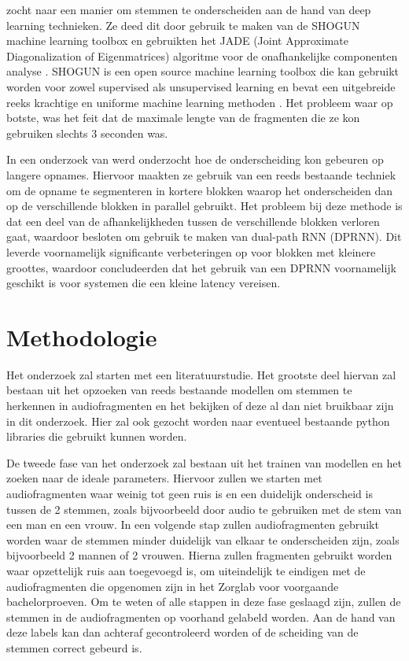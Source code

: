\textcite{Nandal2019} zocht naar een manier om stemmen te onderscheiden aan de hand van deep learning technieken. Ze deed dit door gebruik te maken van de SHOGUN machine learning toolbox en gebruikten het JADE (Joint Approximate Diagonalization of Eigenmatrices) algoritme voor de onafhankelijke componenten analyse \autocite{Nandal2019}. SHOGUN is een open source machine learning toolbox die kan gebruikt worden voor zowel supervised als unsupervised learning en bevat een uitgebreide reeks krachtige en uniforme machine learning methoden \Autocite{Nandal2019}. Het probleem waar \textcite{Nandal2019} op botste, was het feit dat de maximale lengte van de fragmenten die ze kon gebruiken slechts 3 seconden was.

In een onderzoek van \textcite{Li2021} werd onderzocht hoe de onderscheiding kon gebeuren op langere opnames. Hiervoor maakten ze gebruik van een reeds bestaande techniek om de opname te segmenteren in kortere blokken waarop het onderscheiden dan op de verschillende blokken in parallel gebruikt\autocite{Li2021}. Het probleem bij deze methode is dat een deel van de afhankelijkheden tussen de verschillende blokken verloren gaat, waardoor \textcite{Li2021} besloten om gebruik te maken van dual-path RNN (DPRNN). Dit leverde voornamelijk significante verbeteringen op voor blokken met kleinere groottes, waardoor \textcite{Li2021} concludeerden dat het gebruik van een DPRNN voornamelijk geschikt is voor systemen die een kleine latency vereisen.

\section{Methodologie}%
\label{sec:methodologie}

Het onderzoek zal starten met een literatuurstudie. Het grootste deel hiervan zal bestaan uit het opzoeken van reeds bestaande modellen om stemmen te herkennen in audiofragmenten en het bekijken of deze al dan niet bruikbaar zijn in dit onderzoek. Hier zal ook gezocht worden naar eventueel bestaande python libraries die gebruikt kunnen worden.

De tweede fase van het onderzoek zal bestaan uit het trainen van modellen en het zoeken naar de ideale parameters. Hiervoor zullen we starten met audiofragmenten waar weinig tot geen ruis is en een duidelijk onderscheid is tussen de 2 stemmen, zoals bijvoorbeeld door audio te gebruiken met de stem van een man en een vrouw. In een volgende stap zullen audiofragmenten gebruikt worden waar de stemmen minder duidelijk van elkaar te onderscheiden zijn, zoals bijvoorbeeld 2 mannen of 2 vrouwen. Hierna zullen fragmenten gebruikt worden waar opzettelijk ruis aan toegevoegd is, om uiteindelijk te eindigen met de audiofragmenten die opgenomen zijn in het Zorglab voor voorgaande bachelorproeven. Om te weten of alle stappen in deze fase geslaagd zijn, zullen de stemmen in de audiofragmenten op voorhand gelabeld worden. Aan de hand van deze labels kan dan achteraf gecontroleerd worden of de scheiding van de stemmen correct gebeurd is.

